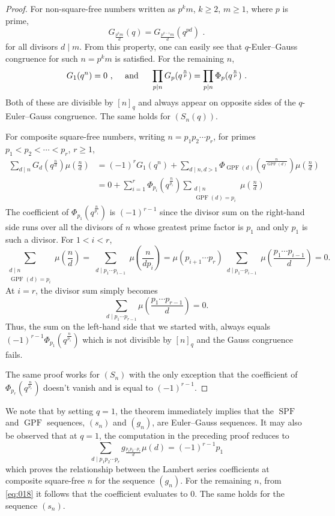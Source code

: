 \documentclass{article}
\numberwithin{equation}{section}
\theoremstyle{definition}
\begin{document}
\begin{proof}
       
     For non-square-free numbers written as $p^km$, $k\geq2$, $m\geq1$, where $p$ is prime, 
    \begin{equation}\label{eq:018}
     G_\frac{p^km}{d}(q)=G_\frac{p^{k-1}m}{d}(q^{pd})\text{ .}
     \end{equation}
     for all divisors $d\mid m$. From this property, one can easily see that $q$-Euler--Gauss congruence for such $n=p^km$ is satisfied. For the remaining $n$, 
     \[G_1(q^n)=0\text{ ,} \hspace{4mm}\text{ and }\hspace{4mm} \prod_{p\mid n}G_p(q^\frac{n}{p})=\prod_{p\mid n}\Phi_p(q^\frac{n}{p})\text{ .}\]
     Both of these are divisible by $[n]_q$ and always appear on opposite sides of the $q$-Euler--Gauss congruence. The same holds for $(S_n(q))$. 
     
     For composite square-free numbers, writing $n=p_1p_2\cdots p_r$, for primes $p_1<p_2<\cdots<p_r$, $r\geq1$,   
\begin{align*}
    \sum_{d\mid n}G_d\!\left(q^\frac{n}{d}\right)\mu\!\left(\frac{n}{d}\right)&=(-1)^rG_1(q^n)+\sum_{d\mid n, d>1}\Phi_{\operatorname{GPF}(d)}\!\left(q^\frac{n}{\operatorname{GPF}(d)}\right)\mu\!\left(\frac{n}{d}\right)\\
    &=0+\sum_{i=1}^r\Phi_{p_i}\!\left(q^\frac{n}{p_i}\right)\sum_{\substack{d\mid n\\\operatorname{GPF}(d)=p_i}}\mu\!\left(\frac{n}{d}\right)
\end{align*}
The coefficient of $\Phi_{p_1}(q^\frac{n}{p_1})$ is $(-1)^{r-1}$ since the divisor sum on the right-hand side runs over all the divisors of $n$ whose greatest prime factor is $p_1$ and only $p_1$ is such a divisor. For $1<i<r$, 
\[\sum_{\substack{d\mid n\\\operatorname{GPF}(d)=p_i}}\mu\!\left(\frac{n}{d}\right)=\sum_{\substack{d\mid p_1\cdots p_{i-1}}}\mu\!\left(\frac{n}{dp_i}\right)=\mu(p_{i+1}\cdots p_r)\sum_{\substack{d\mid p_1\cdots p_{i-1}}}\mu\!\left(\frac{p_1\cdots p_{i-1}}{d}\right)=0.\]
At $i=r$, the divisor sum simply becomes \[\sum_{d\mid p_1\cdots p_{r-1}}\mu\!\left(\frac{p_1\cdots p_{r-1}}{d}\right)=0.\]
Thus, the sum on the left-hand side that we started with, always equals $(-1)^{r-1}\Phi_{p_1}(q^\frac{n}{p_1})$ which is not divisible by $[n]_q$ and the Gauss congruence fails. 

The same proof works for $(S_n)$ with the only exception that the coefficient of $\Phi_{p_r}(q^\frac{n}{p_r})$ doesn't vanish and is equal to $(-1)^{r-1}$. 
\end{proof}
We note that by setting $q=1$, the theorem immediately implies that the $\operatorname{SPF}$ and $\operatorname{GPF}$ sequences, $(s_n)$ and $(g_n)$, are Euler--Gauss sequences. It may also be observed that at $q=1$, the computation in the preceding proof reduces to 
\[\sum_{d\mid p_1p_2\cdots p_r}g_\frac{p_1p_2\cdots p_r}{d}\mu(d)=(-1)^{r-1}p_1\]
which proves the relationship between the Lambert series coefficients at composite square-free $n$ for the sequence $(g_n)$. For the remaining $n$, from \eqref{eq:018} it follows that the coefficient evaluates to $0$. The same holds for the sequence $(s_n)$.
\end{document}
